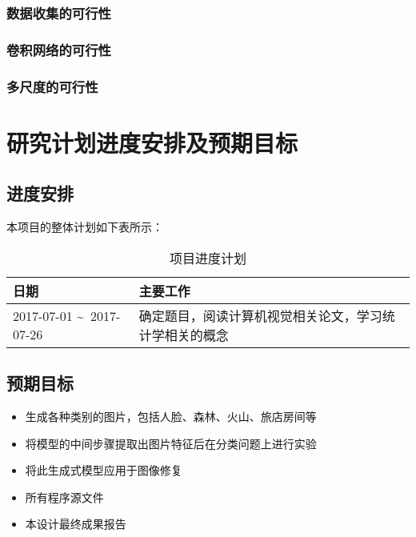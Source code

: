 \subsubsection{数据收集的可行性}


\subsubsection{卷积网络的可行性}


\subsubsection{多尺度的可行性}


\section{研究计划进度安排及预期目标}

\subsection{进度安排}

本项目的整体计划如下表所示：

\begin{table}[!htbp]
\centering
\begin{tabular}{|l|l|}
\hline
日期 & 主要工作 \\ \hline
2017-07-01 \textasciitilde\ 2017-07-26 & 确定题目，阅读计算机视觉相关论文，学习统计学相关的概念 \\ \hline
\end{tabular}
\caption{项目进度计划}
\label{table:schedule}
\end{table}

\subsection{预期目标}

\begin{itemize}
	\item{生成各种类别的图片，包括人脸、森林、火山、旅店房间等}
	\item{将模型的中间步骤提取出图片特征后在分类问题上进行实验}
	\item{将此生成式模型应用于图像修复}
	\item{所有程序源文件}
	\item{本设计最终成果报告}
\end{itemize}



